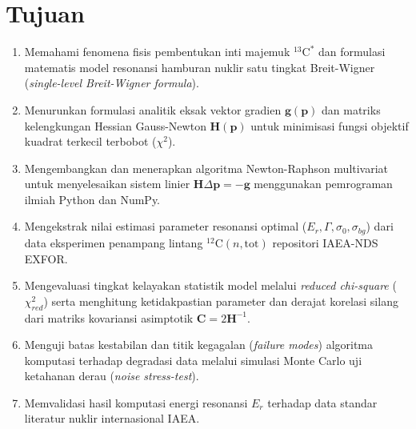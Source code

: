 \section{Tujuan}

\begin{enumerate}
    \item Memahami fenomena fisis pembentukan inti majemuk $^{13}\text{C}^*$ dan formulasi matematis model resonansi hamburan nuklir satu tingkat Breit-Wigner (\textit{single-level Breit-Wigner formula}).
    \item Menurunkan formulasi analitik eksak vektor gradien $\mathbf{g}(\mathbf{p})$ dan matriks kelengkungan Hessian Gauss-Newton $\mathbf{H}(\mathbf{p})$ untuk minimisasi fungsi objektif kuadrat terkecil terbobot ($\chi^2$).
    \item Mengembangkan dan menerapkan algoritma Newton-Raphson multivariat untuk menyelesaikan sistem linier $\mathbf{H}\Delta\mathbf{p} = -\mathbf{g}$ menggunakan pemrograman ilmiah Python dan NumPy.
    \item Mengekstrak nilai estimasi parameter resonansi optimal ($E_r, \Gamma, \sigma_0, \sigma_{bg}$) dari data eksperimen penampang lintang $^{12}\text{C}(n,\text{tot})$ repositori IAEA-NDS EXFOR.
    \item Mengevaluasi tingkat kelayakan statistik model melalui \textit{reduced chi-square} ($\chi^2_{red}$) serta menghitung ketidakpastian parameter dan derajat korelasi silang dari matriks kovariansi asimptotik $\mathbf{C} = 2\mathbf{H}^{-1}$.
    \item Menguji batas kestabilan dan titik kegagalan (\textit{failure modes}) algoritma komputasi terhadap degradasi data melalui simulasi Monte Carlo uji ketahanan derau (\textit{noise stress-test}).
    \item Memvalidasi hasil komputasi energi resonansi $E_r$ terhadap data standar literatur nuklir internasional IAEA.
\end{enumerate}
